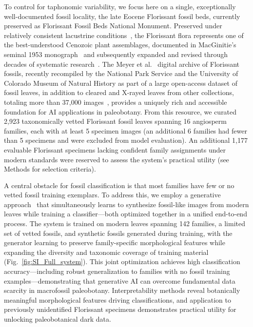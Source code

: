 \documentclass[pdflatex,lineno,sn-nature]{sn-jnl}%
\theoremstyle{plain}%
\theoremstyle{definition}%
\theoremstyle{remark}%
\begin{document}
To control for taphonomic variability, we focus here on a single, exceptionally well-documented fossil locality, the late Eocene Florissant fossil beds, currently preserved as Florissant Fossil Beds National Monument. Preserved under relatively consistent lacustrine conditions~\citep{Harding2000}, the Florissant flora represents one of the best-understood Cenozoic plant assemblages, documented in MacGinitie's seminal 1953 monograph~\citep{mcginitie1953fossil} and subsequently expanded and revised through decades of systematic research~\citep{manchester1983fagopsis,Manchester2001Florissant,Jia2014Cercis,Herendeen2019Arcoa}. The Meyer et al.~\citep{florissant} digital archive of Florissant fossils, recently recompiled by the National Park Service and the University of Colorado Museum of Natural History as part of a large open-access dataset of fossil leaves, in addition to cleared and X-rayed leaves from other collections, totaling more than 37,000 images~\citep{wilf2021dataset}, provides a uniquely rich and accessible foundation for AI applications in paleobotany. From this resource, we curated 2,923 taxonomically vetted Florissant fossil leaves spanning 16 angiosperm families, each with at least 5 specimen images (an additional 6 families had fewer than 5 specimens and were excluded from model evaluation).  An additional 1,177 evaluable Florissant specimens lacking confident family assignments under modern standards were reserved to assess the system's practical utility (see Methods for selection criteria).

A central obstacle for fossil classification is that most families have few or no vetted fossil training exemplars. To address this, we employ a generative approach~\citep{zhang2023adding} that simultaneously learns to synthesize fossil-like images from modern leaves while training a classifier—both optimized together in a unified end-to-end process. The system is trained on modern leaves spanning 142 families, a limited set of vetted fossils, and synthetic fossils generated during training, with the generator learning to preserve family-specific morphological features while expanding the diversity and taxonomic coverage of training material (Fig.~\ref{fig:SI_Full_system}). This joint optimization achieves high classification accuracy---including robust generalization to families with no fossil training examples---demonstrating that generative AI can overcome fundamental data scarcity in macrofossil paleobotany. Interpretability methods reveal botanically meaningful morphological features driving classifications, and application to previously unidentified Florissant specimens demonstrates practical utility for unlocking paleobotanical dark data.
\end{document}

